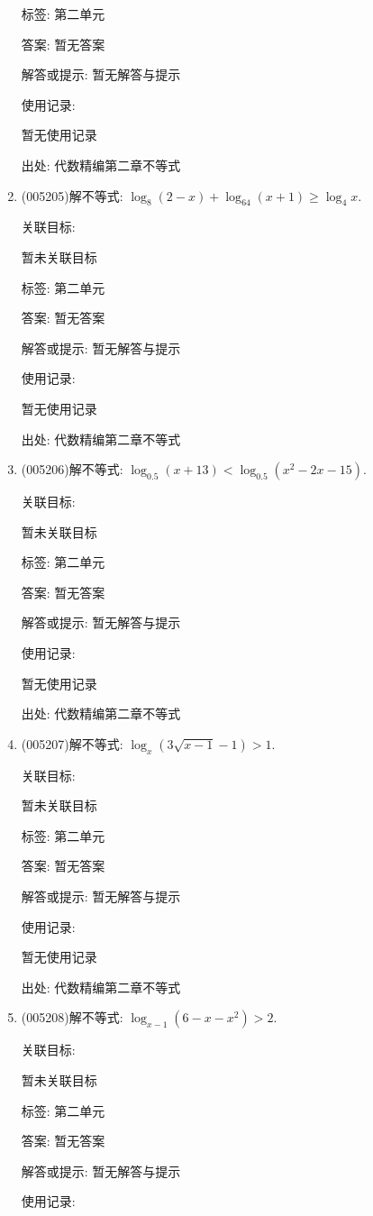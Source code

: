 \documentclass[10pt,a4paper]{article}
\begin{document}
\begin{enumerate}[1.]
标签: 第二单元

答案: 暂无答案

解答或提示: 暂无解答与提示

使用记录:

暂无使用记录


出处: 代数精编第二章不等式
\item { (005205)}解不等式: $\log_8(2-x)+\log_{64}(x+1)\ge \log_4x$.


关联目标:

暂未关联目标



标签: 第二单元

答案: 暂无答案

解答或提示: 暂无解答与提示

使用记录:

暂无使用记录


出处: 代数精编第二章不等式
\item { (005206)}解不等式: $\log_{0.5}(x+13)<\log_{0.5}(x^2-2x-15)$.


关联目标:

暂未关联目标



标签: 第二单元

答案: 暂无答案

解答或提示: 暂无解答与提示

使用记录:

暂无使用记录


出处: 代数精编第二章不等式
\item { (005207)}解不等式: $\log_x(3\sqrt{x-1}-1)>1$.


关联目标:

暂未关联目标



标签: 第二单元

答案: 暂无答案

解答或提示: 暂无解答与提示

使用记录:

暂无使用记录


出处: 代数精编第二章不等式
\item { (005208)}解不等式: $\log_{x-1}(6-x-x^2)>2$.


关联目标:

暂未关联目标



标签: 第二单元

答案: 暂无答案

解答或提示: 暂无解答与提示

使用记录:


\end{enumerate}
\end{document}

